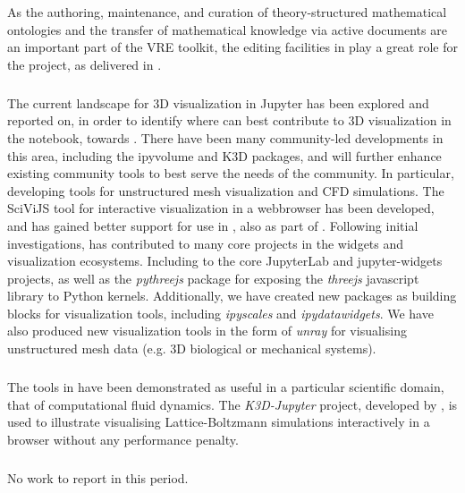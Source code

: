 As the authoring, maintenance, and curation of theory-structured mathematical ontologies and the transfer of mathematical knowledge via active documents are an important part of the \ODK VRE toolkit, the editing facilities in \MathHub play a great role for the project,
as delivered in .

\subparagraph{}

The current landscape for 3D visualization in Jupyter has been explored and reported on,
in order to identify where \ODK can best contribute to 3D visualization in the notebook, towards . There have been many community-led developments in this area, including the ipyvolume and K3D packages, and \ODK will further enhance existing community tools to best serve the needs of the community. In particular, developing tools for unstructured mesh visualization and CFD simulations. The SciViJS tool for interactive visualization in a webbrowser has been developed, and has gained better support for use in \Jupyter, also as part of .
Following initial investigations, \ODK has contributed to many core projects in the \Jupyter widgets and visualization ecosystems. Including to the core JupyterLab and jupyter-widgets projects,
as well as the \emph{pythreejs} package for exposing the \emph{threejs} javascript library to Python kernels.
Additionally, we have created new packages as building blocks for visualization tools,
including \emph{ipyscales} and \emph{ipydatawidgets}.
We have also produced new visualization tools in the form of \emph{unray} for visualising unstructured mesh data
(e.g. 3D biological or mechanical systems).

\subparagraph{} %

The tools in  have been demonstrated as useful in a particular scientific domain,
that of computational fluid dynamics.
The \emph{K3D-Jupyter} project, developed by \ODK, is used to illustrate visualising Lattice-Boltzmann
simulations interactively in a browser without any performance penalty.

\subparagraph{} %

No work to report in this period.

\subparagraph{} %

